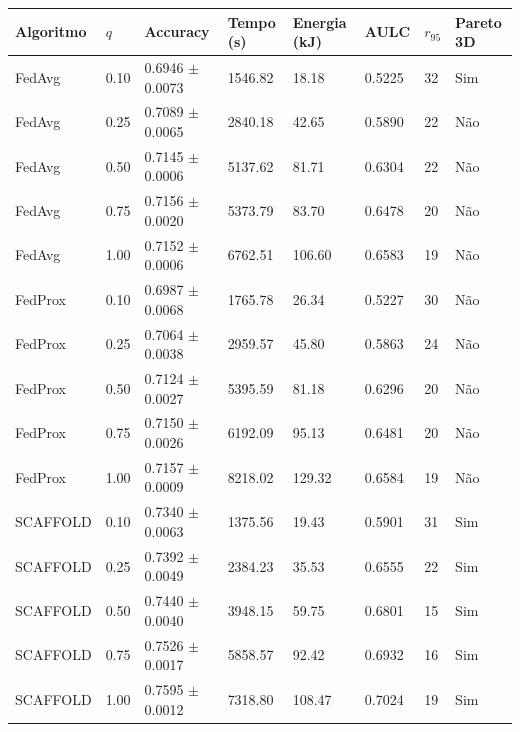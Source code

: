 \begin{tabular}{llllllll}
\toprule
Algoritmo & $q$ & Accuracy & Tempo (s) & Energia (kJ) & AULC & $r_{95}$ & Pareto 3D \\
\midrule
FedAvg & 0.10 & 0.6946 $\pm$ 0.0073 & 1546.82 & 18.18 & 0.5225 & 32 & Sim \\
FedAvg & 0.25 & 0.7089 $\pm$ 0.0065 & 2840.18 & 42.65 & 0.5890 & 22 & Não \\
FedAvg & 0.50 & 0.7145 $\pm$ 0.0006 & 5137.62 & 81.71 & 0.6304 & 22 & Não \\
FedAvg & 0.75 & 0.7156 $\pm$ 0.0020 & 5373.79 & 83.70 & 0.6478 & 20 & Não \\
FedAvg & 1.00 & 0.7152 $\pm$ 0.0006 & 6762.51 & 106.60 & 0.6583 & 19 & Não \\
FedProx & 0.10 & 0.6987 $\pm$ 0.0068 & 1765.78 & 26.34 & 0.5227 & 30 & Não \\
FedProx & 0.25 & 0.7064 $\pm$ 0.0038 & 2959.57 & 45.80 & 0.5863 & 24 & Não \\
FedProx & 0.50 & 0.7124 $\pm$ 0.0027 & 5395.59 & 81.18 & 0.6296 & 20 & Não \\
FedProx & 0.75 & 0.7150 $\pm$ 0.0026 & 6192.09 & 95.13 & 0.6481 & 20 & Não \\
FedProx & 1.00 & 0.7157 $\pm$ 0.0009 & 8218.02 & 129.32 & 0.6584 & 19 & Não \\
SCAFFOLD & 0.10 & 0.7340 $\pm$ 0.0063 & 1375.56 & 19.43 & 0.5901 & 31 & Sim \\
SCAFFOLD & 0.25 & 0.7392 $\pm$ 0.0049 & 2384.23 & 35.53 & 0.6555 & 22 & Sim \\
SCAFFOLD & 0.50 & 0.7440 $\pm$ 0.0040 & 3948.15 & 59.75 & 0.6801 & 15 & Sim \\
SCAFFOLD & 0.75 & 0.7526 $\pm$ 0.0017 & 5858.57 & 92.42 & 0.6932 & 16 & Sim \\
SCAFFOLD & 1.00 & 0.7595 $\pm$ 0.0012 & 7318.80 & 108.47 & 0.7024 & 19 & Sim \\
\bottomrule
\end{tabular}
